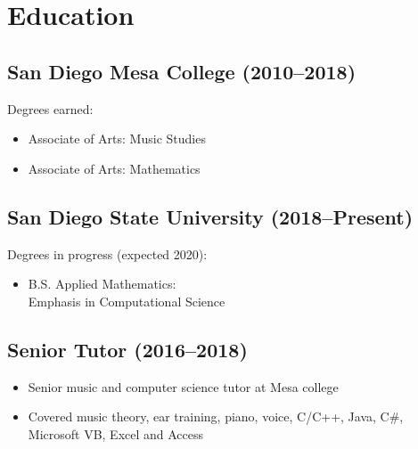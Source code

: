 \documentclass[10pt, letterpaper]{article}
\begin{document}
\section{Education}
\begin{multicols}{2}
  \begin{minipage}{0.5\textwidth}
    \subsection{San Diego Mesa College (2010--2018)}
    \begin{footnotesize}
      Degrees earned:
      \begin{itemize}
        \item
          Associate of Arts: Music Studies

        \item
          Associate of Arts: Mathematics
      \end{itemize}
    \end{footnotesize}
    \medskip

    \subsection{San Diego State University (2018--Present)}
    \begin{footnotesize}
      Degrees in progress (expected 2020):
      \begin{itemize}
        \item
          B.S. Applied Mathematics:\\
          \phantom{B.s. }Emphasis in Computational Science
      \end{itemize}
    \end{footnotesize}
  \end{minipage}
  \columnbreak%

  \begin{minipage}{0.5\textwidth}
    \subsection{Senior Tutor (2016--2018)}
    \begin{footnotesize}
      \begin{itemize}
        \item
          Senior music and computer science tutor at Mesa college
        \item
          Covered music theory, ear training, piano, voice, C/C++,
          Java, C\#, Microsoft VB, Excel and Access
      \end{itemize}
    \end{footnotesize}
    \medskip


\end{minipage}
\end{multicols}
\end{document}
